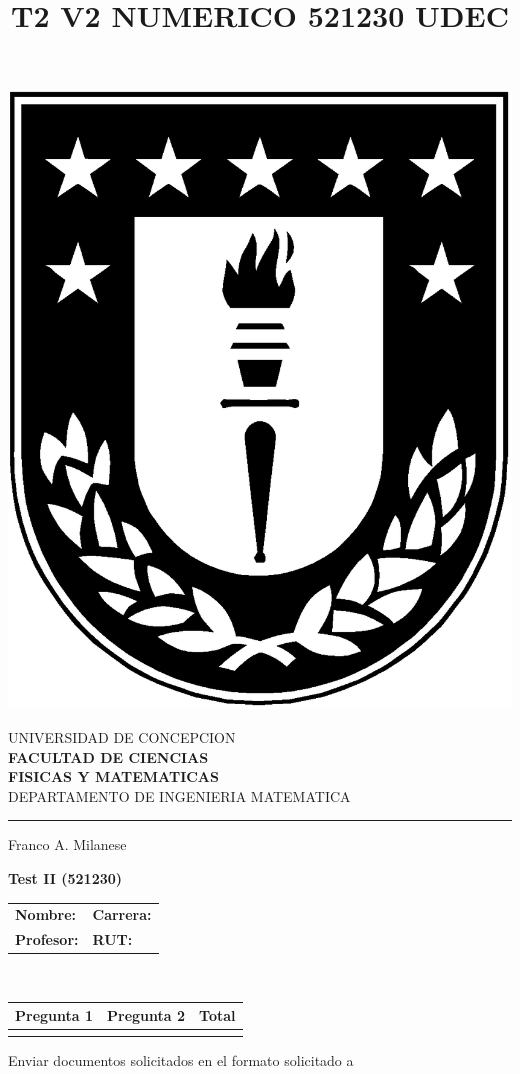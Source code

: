 \documentclass[11pt]{article}
\begin{document}
\title{T2 V2 NUMERICO 521230 UDEC}

\begin{minipage}{0.12\textwidth}
\includegraphics[width=\textwidth]{logoudec.eps}
\end{minipage}
\hspace{5mm}
\begin{minipage}{0.9\textwidth}
UNIVERSIDAD DE CONCEPCION\\
{\small\small\bf 
FACULTAD DE CIENCIAS\\ 
FISICAS Y MATEMATICAS}\\
DEPARTAMENTO DE INGENIERIA MATEMATICA\\
\rule{0.66\textwidth}{.5pt} Franco A. Milanese
\end{minipage}

\vspace{0.5cm}
\centerline{\bf Test II (521230)}
\begin{center}
 \begin{tabular}{p{}p{}}
	\textbf{Nombre:}   &\textbf{Carrera:}\\
	\textbf{Profesor:} & \textbf{ RUT:}
 \end{tabular}
 \\
 \vspace{0.2cm}
 \begin{tabular}{||p{2cm}|p{2cm}||p{2cm}||}
 \hline
 Pregunta 1 &  Pregunta 2 &     Total\\
 \hline

  \vspace{1.5cm} & &       \\
 \hline
 \end{tabular}
 \end{center}
 Enviar documentos solicitados en el formato solicitado a 
\end{document}

